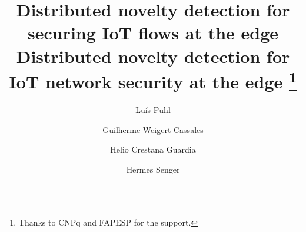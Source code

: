 \documentclass[runningheads]{lib/llncs}
\begin{document}
\title{
Distributed novelty detection for securing IoT flows at the edge
\\
Distributed novelty detection for IoT network security at the edge
\thanks{Thanks to CNPq and  FAPESP for the support.}}

\author{
  Luís Puhl \and
  Guilherme Weigert Cassales  \and
  Helio Crestana Guardia
  \and
  Hermes Senger
}

\maketitle


\FloatBarrier
\FloatBarrier
\FloatBarrier
\FloatBarrier




\end{document}

